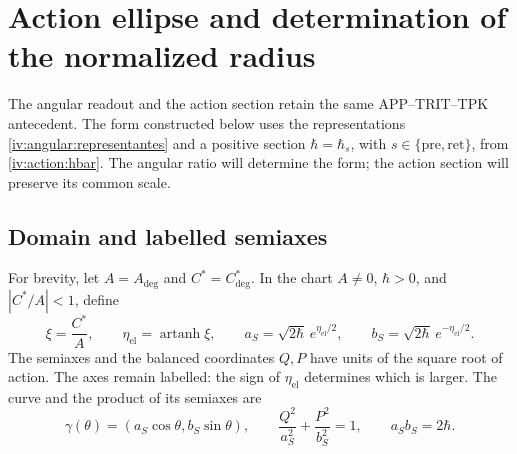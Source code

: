 \section{Action ellipse and determination of the normalized radius}
\label{iv:ellipse:section}

The angular readout and the action section retain the same
APP--TRIT--TPK antecedent. The form constructed
below uses the representations
\eqref{iv:angular:representantes} and a positive section
\(\hbar=\hbar_s\), with
\(s\in\{\mathrm{pre},\mathrm{ret}\}\), from
\eqref{iv:action:hbar}. The angular ratio will determine the form;
the action section will preserve its common scale.

\subsection{Domain and labelled semiaxes}
\label{iv:ellipse:dominio}

For brevity, let \(A=A_{\deg}\) and \(C^*=C^*_{\deg}\).
In the chart \(A\ne0\), \(\hbar>0\), and \(|C^*/A|<1\),
define
\begin{equation}
 \xi=\frac{C^*}{A},\qquad
 \eta_{\mathrm{el}}=\operatorname{artanh}\xi,\qquad
 a_S=\sqrt{2\hbar}\,e^{\eta_{\mathrm{el}}/2},\qquad
 b_S=\sqrt{2\hbar}\,e^{-\eta_{\mathrm{el}}/2}.
 \label{iv:ellipse:semiejes}
\end{equation}
The semiaxes and the balanced coordinates \(Q,P\) have
units of the square root of action. The axes remain labelled:
the sign of \(\eta_{\mathrm{el}}\) determines which is
larger. The curve and the product of its semiaxes are
\begin{equation}
 \gamma(\theta)=(a_S\cos\theta,b_S\sin\theta),\qquad
 \frac{Q^2}{a_S^2}+\frac{P^2}{b_S^2}=1,\qquad
 a_Sb_S=2\hbar.
 \label{iv:ellipse:curva}
\end{equation}

